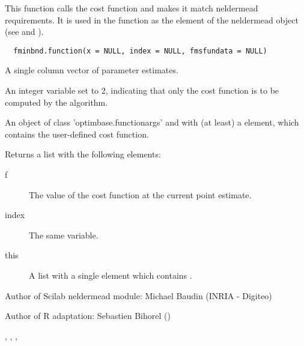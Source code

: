 %
\begin{Description}\relax
This function calls the cost function and makes it match neldermead
requirements. It is used in the  function as the
 element of the neldermead object (see 
and ). 
\end{Description}
%
\begin{Usage}
\begin{verbatim}
  fminbnd.function(x = NULL, index = NULL, fmsfundata = NULL)
\end{verbatim}
\end{Usage}
%
\begin{Arguments}
\begin{ldescription}
\item[\code{x}] A single column vector of parameter estimates.
\item[\code{index}] An integer variable set to 2, indicating that only the cost
function is to be computed by the algorithm.
\item[\code{fmsfundata}] An object of class 'optimbase.functionargs' and with 
(at least) a  element, which contains the user-defined cost 
function.
\end{ldescription}
\end{Arguments}
%
\begin{Value}
Returns a list with the following elements: \begin{description}

\item[f] The value of the cost function at the current point estimate.
\item[index] The same  variable.
\item[this] A list with a single element  which
contains .

\end{description}

\end{Value}
%
\begin{Author}\relax
Author of Scilab neldermead module: Michael Baudin (INRIA - Digiteo)

Author of R adaptation: Sebastien Bihorel ()
\end{Author}
%
\begin{SeeAlso}\relax
{},
,
,
\end{SeeAlso}
